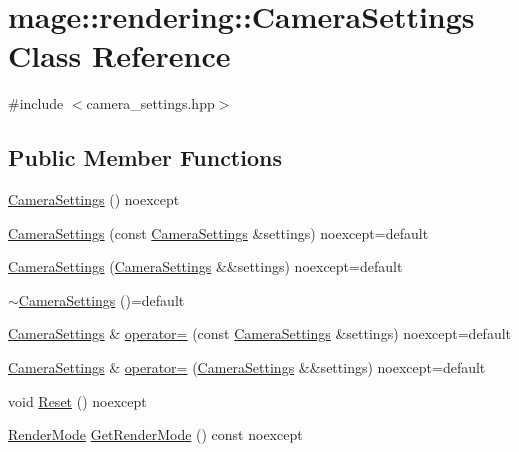 \hypertarget{classmage_1_1rendering_1_1_camera_settings}{}\section{mage\+:\+:rendering\+:\+:Camera\+Settings Class Reference}
\label{classmage_1_1rendering_1_1_camera_settings}


{\ttfamily \#include $<$camera\+\_\+settings.\+hpp$>$}

\subsection*{Public Member Functions}
\begin{DoxyCompactItemize}
\item 
\hyperlink{classmage_1_1rendering_1_1_camera_settings_a46be4ca54bacf2597672a2e944f9fef6}{Camera\+Settings} () noexcept
\item 
\hyperlink{classmage_1_1rendering_1_1_camera_settings_af0501d9365b74ce296a517b40a13e81e}{Camera\+Settings} (const \hyperlink{classmage_1_1rendering_1_1_camera_settings}{Camera\+Settings} \&settings) noexcept=default
\item 
\hyperlink{classmage_1_1rendering_1_1_camera_settings_a08e6d9c319feb6af0c14f4d057220da8}{Camera\+Settings} (\hyperlink{classmage_1_1rendering_1_1_camera_settings}{Camera\+Settings} \&\&settings) noexcept=default
\item 
\hyperlink{classmage_1_1rendering_1_1_camera_settings_a0e5badc4e959b8ddad0d7df2da4c934f}{$\sim$\+Camera\+Settings} ()=default
\item 
\hyperlink{classmage_1_1rendering_1_1_camera_settings}{Camera\+Settings} \& \hyperlink{classmage_1_1rendering_1_1_camera_settings_a8cc59c883ea4c45a6bb7e9dc728856fd}{operator=} (const \hyperlink{classmage_1_1rendering_1_1_camera_settings}{Camera\+Settings} \&settings) noexcept=default
\item 
\hyperlink{classmage_1_1rendering_1_1_camera_settings}{Camera\+Settings} \& \hyperlink{classmage_1_1rendering_1_1_camera_settings_a28ae670d467adfc74ef8929f24b2e615}{operator=} (\hyperlink{classmage_1_1rendering_1_1_camera_settings}{Camera\+Settings} \&\&settings) noexcept=default
\item 
void \hyperlink{classmage_1_1rendering_1_1_camera_settings_aee82c8e6ad327e0a5bda4d3a56d69587}{Reset} () noexcept
\item 
\hyperlink{namespacemage_1_1rendering_aeb14ce7610cc9391f4e01be027b91dcc}{Render\+Mode} \hyperlink{classmage_1_1rendering_1_1_camera_settings_ab1421b9c47b7eafbebd0619c5b5116b5}{Get\+Render\+Mode} () const noexcept

\end{DoxyCompactItemize}
